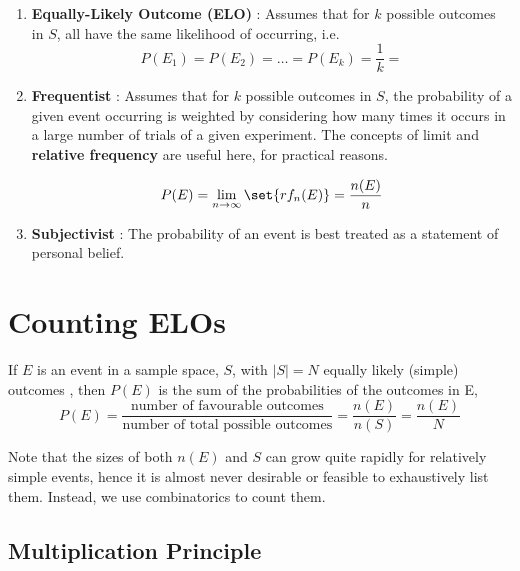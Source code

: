 \documentclass[english,course]{Notes}
\begin{document}
\begin{enumerate}
\item \textbf{Equally-Likely Outcome (ELO)} : Assumes that for $k$ possible outcomes in $S$, all have the same likelihood of occurring, i.e. $$ P(E_{1}) = P(E_{2}) = \dots = P(E_{k}) = \frac{1}{k} =  $$

\item \textbf{Frequentist} : Assumes that for $k$ possible outcomes in $S$, the probability of a given event occurring is weighted by considering how many times it occurs in a large number of trials of a given experiment. The concepts of limit and \textbf{relative frequency} are useful here, for practical reasons.

$$ P(E) = \lim_{n \to \infty}\set{rf_{n}(E)} = \frac{n(E)}{n} $$ 

\item \textbf{Subjectivist} : The probability of an event is best treated as a statement of personal belief.

\end{enumerate}

\newpage
\section{Counting ELOs}

\par{If $E$ is an event in a sample space, $S$, with $|S| = N$ equally likely (simple) outcomes , then $P(E)$ is the sum of the probabilities of the outcomes in E,}
$$ P(E) = \frac{\text{number of favourable outcomes}}{\text{number of total possible outcomes}} =  \frac{n(E)}{n(S)} = \frac{n(E)}{N}$$

\par{Note that the sizes of both $n(E)$ and $S$ can grow quite rapidly for relatively simple events, hence it is almost never desirable or feasible to exhaustively list them. Instead, we use combinatorics to count them.}

\subsection{Multiplication Principle}
\end{document}
